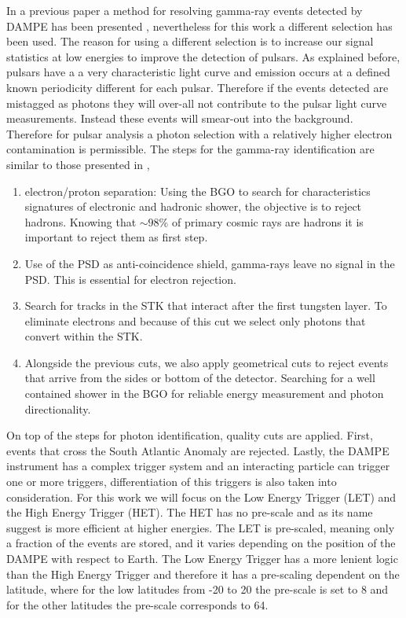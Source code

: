 \documentclass{PoS}
\begin{document}
In a previous paper  a method for resolving gamma-ray events detected by DAMPE has been presented \cite{zunlei}, nevertheless for this work a different selection has been used. The reason for using a different selection is to increase our signal statistics at low energies to improve the detection of pulsars. As explained before, pulsars have a a very characteristic light curve and emission occurs at a defined known periodicity different  for each pulsar. Therefore if the events detected are mistagged as photons they will over-all not contribute to the pulsar light curve measurements. Instead these events will smear-out into the background. Therefore for pulsar analysis a photon selection with a relatively higher electron contamination is permissible.
The steps for the gamma-ray identification are similar to those presented in \cite{zunlei},
\begin{enumerate}
	\item electron/proton separation: Using the BGO to search for characteristics signatures of electronic and hadronic shower, the objective is to reject hadrons. Knowing that $\sim 98\%$ of primary cosmic rays are hadrons it is important to reject them as first step.
	\item Use of the PSD as anti-coincidence shield, gamma-rays leave no signal in the PSD. This is essential for electron rejection.
	\item Search for tracks in the STK that interact after the first tungsten layer. To eliminate electrons and because of this cut we select only photons that convert within the STK.
	\item Alongside the previous cuts, we also apply geometrical cuts to reject events that arrive from the sides or bottom of the detector. Searching for a well contained shower in the BGO for reliable energy measurement and photon directionality.

\end{enumerate}

On top of the steps for photon identification, quality cuts are applied. First, events that cross the South Atlantic Anomaly are rejected. Lastly, the DAMPE instrument has a complex trigger system and an interacting particle can trigger one or more triggers, differentiation of this triggers is also taken into consideration. For this work we will focus on the Low Energy Trigger (LET) and the High Energy Trigger (HET). The HET has no pre-scale and as its name suggest is more efficient at higher energies. The LET is pre-scaled, meaning only a fraction of the events are stored,  and it varies depending on the position of the DAMPE with respect to Earth. The Low Energy Trigger has a more lenient logic than the High Energy Trigger and therefore it has a pre-scaling dependent on the latitude, where for the low latitudes from -20 to 20 the pre-scale is set to 8 and for the other latitudes the pre-scale corresponds to 64.
\end{document}
